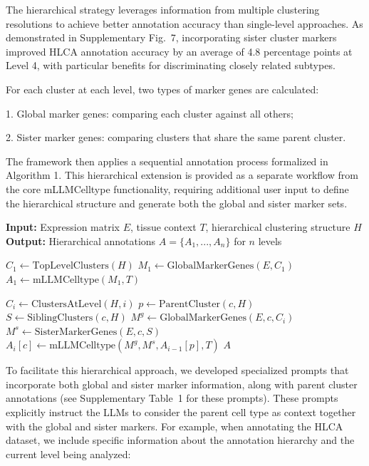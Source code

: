 \documentclass[pdflatex,sn-nature]{sn-jnl}%
\theoremstyle{thmstyleone}%
\theoremstyle{thmstyletwo}%
\theoremstyle{thmstylethree}%
\begin{document}
The hierarchical strategy leverages information from multiple clustering resolutions to achieve better annotation accuracy than single-level approaches. As demonstrated in Supplementary Fig.~7, incorporating sister cluster markers improved HLCA annotation accuracy by an average of 4.8 percentage points at Level 4, with particular benefits for discriminating closely related subtypes.

For each cluster at each level, two types of marker genes are calculated:

1. Global marker genes: comparing each cluster against all others;

2. Sister marker genes: comparing clusters that share the same parent cluster.

The framework then applies a sequential annotation process formalized in Algorithm 1. This hierarchical extension is provided as a separate workflow from the core mLLMCelltype functionality, requiring additional user input to define the hierarchical structure and generate both the global and sister marker sets.

\begin{algorithm}
\caption{Hierarchical Cell Type Annotation}
\begin{algorithmic}\label{alg1}
\State \textbf{Input:} Expression matrix $E$, tissue context $T$, hierarchical clustering structure $H$
\State \textbf{Output:} Hierarchical annotations $A=\{A_1,...,A_n\}$ for $n$ levels

\State $C_1 \gets \text{TopLevelClusters}(H)$ 
\State $M_1 \gets \text{GlobalMarkerGenes}(E, C_1)$
\State $A_1 \gets \text{mLLMCelltype}(M_1, T)$ 

 
    \State $C_i \gets \text{ClustersAtLevel}(H, i)$
        \State $p \gets \text{ParentCluster}(c, H)$ 
        \State $S \gets \text{SiblingClusters}(c, H)$ 
        \State $M^g \gets \text{GlobalMarkerGenes}(E, c, C_i)$
        \State $M^s \gets \text{SisterMarkerGenes}(E, c, S)$
        \State $A_i[c] \gets \text{mLLMCelltype}(M^g, M^s, A_{i-1}[p], T)$ 
    \EndFor
\EndFor
\State \Return $A$
\end{algorithmic}
\end{algorithm}

To facilitate this hierarchical approach, we developed specialized prompts that incorporate both global and sister marker information, along with parent cluster annotations (see Supplementary Table~1 for these prompts). These prompts explicitly instruct the LLMs to consider the parent cell type as context together with the global and sister markers. For example, when annotating the HLCA dataset, we include specific information about the annotation hierarchy and the current level being analyzed:
\end{document}
